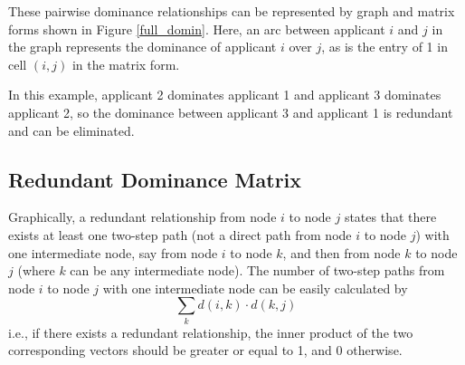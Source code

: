 \documentclass[12pt,english]{report}
\begin{document}
These pairwise dominance relationships can be represented by graph and matrix forms shown in Figure \ref{full_domin}. Here, an arc between applicant $i$ and $j$ in the graph represents the dominance of applicant $i$ over $j$,  as is the entry of 1 in cell $(i,j)$ in the matrix form.


\begin{figure}
    \begin{floatrow}
    \capbtabbox{%
        \begin{tabular}{l|llllll}
            & 1 & 2 & 3 & 4 & 5 & 6 \\ \hline
            1 & 0 & 0 & 0 & 0 & 0 & 0 \\
            2 & 1 & 0 & 0 & 1 & 1 & 0 \\
            3 & 1 & 1 & 0 & 1 & 1 & 0 \\
            4 & 0 & 0 & 0 & 0 & 0 & 0 \\
            5 & 0 & 0 & 0 & 0 & 0 & 0 \\
            6 & 1 & 1 & 0 & 1 & 1 & 0 \\
        \end{tabular}%
    }{%
    \caption{Full dominance relationships in matrix form}%
    \label{full_domin}
}
\end{floatrow}
\end{figure}


In this example, applicant 2 dominates applicant 1 and applicant 3 dominates applicant 2, so the dominance between applicant 3 and applicant 1 is redundant and can be eliminated.

\subsection{Redundant Dominance Matrix}
Graphically, a redundant relationship from node $i$ to node $j$ states that there exists at least one two-step path (not a direct path from node $i$ to node $j$) with one intermediate node, say from node $i$ to node $k$, and then from node $k$ to node $j$ (where $k$ can be any intermediate node).  The number of two-step paths from node $i$ to node $j$ with one intermediate node can be easily calculated by $$ \sum_k d(i,k) \cdot  d(k,j)$$ i.e., if there exists a redundant relationship, the inner product of the two corresponding vectors should be greater or equal to 1, and 0 otherwise.
\end{document}
